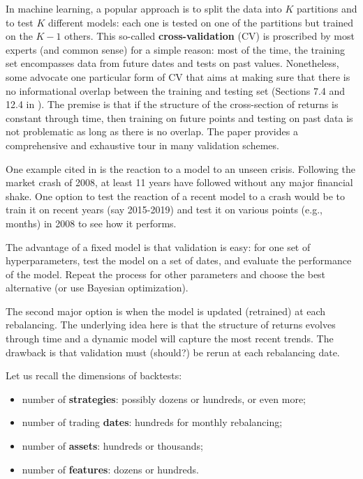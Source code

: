 In machine learning, a popular approach is to split the data into $K$ partitions and to test $K$ different models: each one is tested on one of the partitions but trained on the $K -1$ others. This so-called \textbf{cross-validation} (CV) is proscribed by most experts (and common sense) for a simple reason: most of the time, the training set encompasses data from future dates and tests on past values. Nonetheless, some advocate one particular form of CV that aims at making sure that there is no informational overlap between the training and testing set (Sections 7.4 and 12.4 in \cite{de2018advances}). The premise is that if the structure of the cross-section of returns is constant through time, then training on future points and testing on past data is not problematic as long as there is no overlap. The paper \cite{schnaubelt2019comparison} provides a comprehensive and exhaustive tour in many validation schemes.

One example cited in \cite{de2018advances} is the reaction to a model to an unseen crisis. Following the market crash of 2008, at least 11 years have followed without any major financial shake. One option to test the reaction of a recent model to a crash would be to train it on recent years (say 2015-2019) and test it on various points (e.g., months) in 2008 to see how it performs.

The advantage of a fixed model is that validation is easy: for one set of hyperparameters, test the model on a set of dates, and evaluate the performance of the model. Repeat the process for other parameters and choose the best alternative (or use Bayesian optimization).

The second major option is when the model is updated (retrained) at each rebalancing. The underlying idea here is that the structure of returns evolves through time and a dynamic model will capture the most recent trends. The drawback is that validation must (should?) be rerun at each rebalancing date.

Let us recall the dimensions of backtests:

\begin{itemize}
\item number of \textbf{strategies}: possibly dozens or hundreds, or even more;
\item number of trading \textbf{dates}: hundreds for monthly rebalancing;
\item number of \textbf{assets}: hundreds or thousands;
\item number of \textbf{features}: dozens or hundreds.
\end{itemize}

